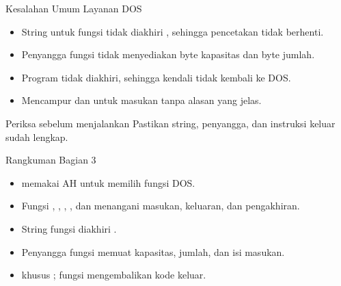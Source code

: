 \documentclass[aspectratio=169,11pt]{beamer}
\begin{document}
\begin{frame}{Kesalahan Umum Layanan DOS}
\small
\begin{itemize}
    \item String untuk fungsi  tidak diakhiri
          , sehingga pencetakan tidak berhenti.

    \vspace{0.18em}
    \item Penyangga fungsi  tidak menyediakan byte
          kapasitas dan byte jumlah.

    \vspace{0.18em}
    \item Program tidak diakhiri, sehingga kendali tidak kembali
          ke DOS.

    \vspace{0.18em}
    \item Mencampur  dan  untuk
          masukan tanpa alasan yang jelas.
\end{itemize}

\vspace{0.2em}
\begin{alertblock}{Periksa sebelum menjalankan}
\small Pastikan string, penyangga, dan instruksi keluar sudah
lengkap.
\end{alertblock}
\end{frame}

\begin{frame}{Rangkuman Bagian 3}
\small
\begin{itemize}
    \item {} memakai AH untuk memilih fungsi DOS.

    \vspace{0.15em}
    \item Fungsi , , , , dan
           menangani masukan, keluaran, dan pengakhiran.

    \vspace{0.15em}
    \item String fungsi  diakhiri .

    \vspace{0.15em}
    \item Penyangga fungsi  memuat kapasitas, jumlah, dan
          isi masukan.

    \vspace{0.15em}
    \item {} khusus ; fungsi 
          mengembalikan kode keluar.
\end{itemize}
\end{frame}
\end{document}
